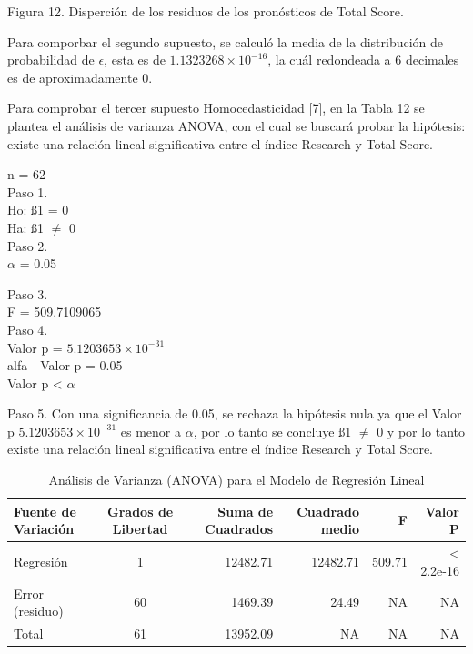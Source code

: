 \documentclass[
]{article}
\begin{document}
\begin{multicols}{2}
Figura 12. Disperción de los residuos de los pronósticos de Total Score.



Para comporbar el segundo supuesto, se calculó la media de la distribución de probabilidad de $\epsilon$, esta es de \ensuremath{1.1323268\times 10^{-16}}, la cuál redondeada a 6 decimales es de aproximadamente 0.

Para comprobar el tercer supuesto Homocedasticidad [7], en la Tabla 12 se plantea el análisis de varianza ANOVA, con el cual se buscará probar la hipótesis: existe una relación lineal significativa entre el índice Research y Total Score.




n = 62\\
Paso 1.\\
Ho: ß1 = 0\\
Ha: ß1 $≠$ 0\\

Paso 2.\\
$\alpha$ = 0.05

Paso 3.\\
F = 509.7109065\\

Paso 4.\\
Valor p = \ensuremath{5.1203653\times 10^{-31}}\\
alfa - Valor p = 0.05\\
Valor p < $\alpha$

Paso 5.
Con una significancia de 0.05, se rechaza la hipótesis nula ya que el Valor p \ensuremath{5.1203653\times 10^{-31}} es menor a  $\alpha$, por lo tanto se concluye ß1 $≠$ 0 y por lo tanto existe una relación lineal significativa entre el índice Research y Total Score.


\end {multicols}

\renewcommand{\arraystretch}{1.3}
\begin{footnotesize}
\begin{longtable}[t]{lcrrrr}
\caption{\label{tab:tabla12}Análisis de Varianza (ANOVA) para el Modelo de Regresión Lineal}\\
\toprule
Fuente de Variación & Grados de Libertad & Suma de Cuadrados & Cuadrado medio & F & Valor P\\
\midrule
Regresión & 1 & 12482.71 & 12482.71 & 509.71 & < 2.2e-16\\
Error (residuo) & 60 & 1469.39 & 24.49 & NA & NA\\
Total & 61 & 13952.09 & NA & NA & NA\\
\bottomrule
\end{longtable}

\end{footnotesize}\renewcommand{\arraystretch}{1}
\end{document}
